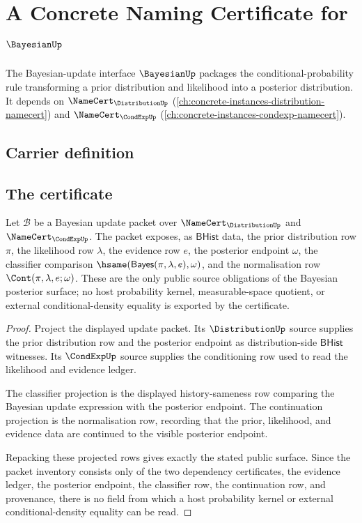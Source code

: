\chapter{A Concrete Naming Certificate for $\BayesianUp$}
\label{ch:concrete-instances-bayesian-namecert}

The Bayesian-update interface $\BayesianUp$ packages the conditional-probability rule transforming a prior distribution and likelihood into a posterior distribution. It depends on $\NameCert_{\DistributionUp}$ (\autoref{ch:concrete-instances-distribution-namecert}) and $\NameCert_{\CondExpUp}$ (\autoref{ch:concrete-instances-condexp-namecert}).

\section{Carrier definition}
\label{sec:bayesian-carrier}

\section{The certificate}
\label{sec:bayesian-certificate}

\begin{theorem}
\label{thm:bayesian-posterior-source-obligation}
Let $\mathcal{B}$ be a Bayesian update packet over
$\NameCert_{\DistributionUp}$ and $\NameCert_{\CondExpUp}$. The packet exposes,
as $\mathsf{BHist}$ data, the prior distribution row $\pi$, the likelihood row
$\lambda$, the evidence row $e$, the posterior endpoint $\omega$, the classifier
comparison $\hsame(\mathsf{Bayes}(\pi,\lambda,e),\omega)$, and the
normalisation row $\Cont(\pi,\lambda,e;\omega)$. These are the only public
source obligations of the Bayesian posterior surface; no host probability
kernel, measurable-space quotient, or external conditional-density equality is
exported by the certificate.
\end{theorem}
\begin{proof}
Project the displayed update packet. Its $\DistributionUp$ source supplies the
prior distribution row and the posterior endpoint as distribution-side
$\mathsf{BHist}$ witnesses. Its $\CondExpUp$ source supplies the conditioning
row used to read the likelihood and evidence ledger.

The classifier projection is the displayed history-sameness row comparing the
Bayesian update expression with the posterior endpoint. The continuation
projection is the normalisation row, recording that the prior, likelihood, and
evidence data are continued to the visible posterior endpoint.

Repacking these projected rows gives exactly the stated public surface. Since
the packet inventory consists only of the two dependency certificates, the
evidence ledger, the posterior endpoint, the classifier row, the continuation
row, and provenance, there is no field from which a host probability kernel or
external conditional-density equality can be read.
\end{proof}


